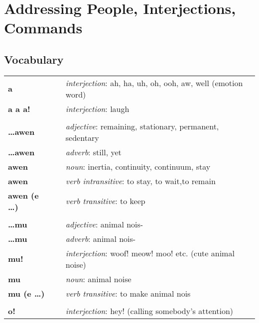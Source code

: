 \section{Addressing People, Interjections, Commands} 
%
\subsection*{Vocabulary}
%
\begin{supertabular}{p{2,5cm}|ll}
%
\textbf{a} && \textit{interjection}: ah, ha, uh, oh, ooh, aw, well (emotion word) \\ %
\textbf{a a a!} && \textit{interjection}: laugh \\ %
 && \\ %
%
\textbf{\dots awen} && \textit{adjective}: remaining, stationary, permanent, sedentary \\ %
\textbf{\dots awen} && \textit{adverb}: still, yet \\ %
\textbf{awen} && \textit{noun}: inertia, continuity, continuum, stay \\ %
\textbf{awen} && \textit{verb intransitive}: to stay, to wait,to remain \\ %
\textbf{awen (e \dots)} && \textit{verb transitive}: to keep \\ %
 && \\ %
%
\textbf{\dots mu} && \textit{adjective}: animal nois- \\ %
\textbf{\dots mu} && \textit{adverb}: animal nois- \\ %
\textbf{mu!} && \textit{interjection}: woof! meow! moo! etc. (cute animal noise) \\ %
\textbf{mu} && \textit{noun}: animal noise \\ %
\textbf{mu (e \dots)} && \textit{verb transitive}: to make animal nois \\ %
 && \\ %
%
\textbf{o!} && \textit{interjection}: hey! (calling somebody's attention) \\ %

\end{supertabular}
